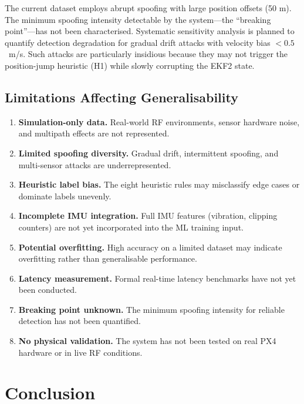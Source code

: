 \documentclass[11pt,a4paper]{article}
\begin{document}
The current dataset employs abrupt spoofing with large position offsets (50 m). The minimum spoofing intensity detectable by the system---the ``breaking point''---has not been characterised. Systematic sensitivity analysis is planned to quantify detection degradation for gradual drift attacks with velocity bias $< 0.5$~m/s. Such attacks are particularly insidious because they may not trigger the position-jump heuristic (H1) while slowly corrupting the EKF2 state.

\subsection{Limitations Affecting Generalisability}

\begin{enumerate}
    \item \textbf{Simulation-only data.} Real-world RF environments, sensor hardware noise, and multipath effects are not represented.
    \item \textbf{Limited spoofing diversity.} Gradual drift, intermittent spoofing, and multi-sensor attacks are underrepresented.
    \item \textbf{Heuristic label bias.} The eight heuristic rules may misclassify edge cases or dominate labels unevenly.
    \item \textbf{Incomplete IMU integration.} Full IMU features (vibration, clipping counters) are not yet incorporated into the ML training input.
    \item \textbf{Potential overfitting.} High accuracy on a limited dataset may indicate overfitting rather than generalisable performance.
    \item \textbf{Latency measurement.} Formal real-time latency benchmarks have not yet been conducted.
    \item \textbf{Breaking point unknown.} The minimum spoofing intensity for reliable detection has not been quantified.
    \item \textbf{No physical validation.} The system has not been tested on real PX4 hardware or in live RF conditions.
\end{enumerate}

\section{Conclusion}
\end{document}
